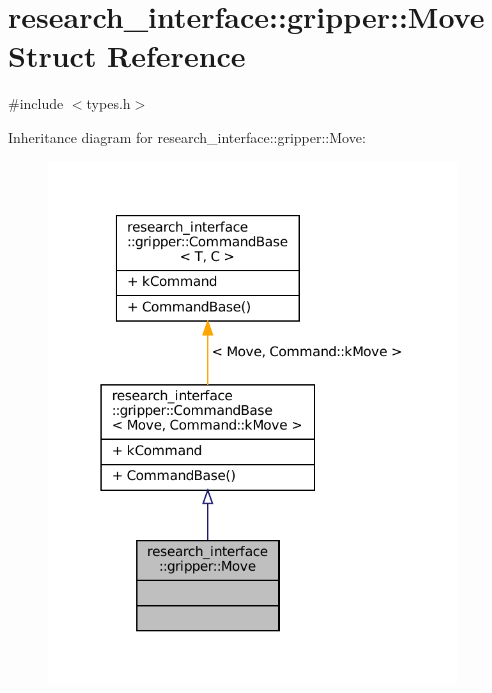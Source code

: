\hypertarget{structresearch__interface_1_1gripper_1_1Move}{}\section{research\+\_\+interface\+:\+:gripper\+:\+:Move Struct Reference}
\label{structresearch__interface_1_1gripper_1_1Move}


{\ttfamily \#include $<$types.\+h$>$}



Inheritance diagram for research\+\_\+interface\+:\+:gripper\+:\+:Move\+:
\nopagebreak
\begin{figure}[H]
\begin{center}
\leavevmode
\includegraphics[width=307pt]{structresearch__interface_1_1gripper_1_1Move__inherit__graph}
\end{center}
\end{figure}


